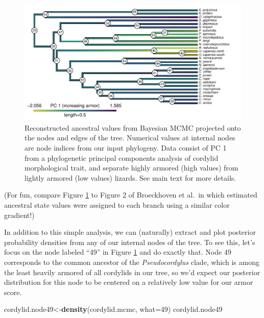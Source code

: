 \documentclass[fleqn,10pt,lineno]{wlpeerj} %
\newenvironment{Shaded}{\begin{snugshade}}{\end{snugshade}}
\newcommand{\AttributeTok}[1]{\textcolor[rgb]{0.13,0.29,0.53}{#1}}
\newcommand{\DecValTok}[1]{\textcolor[rgb]{0.00,0.00,0.81}{#1}}
\newcommand{\FunctionTok}[1]{\textcolor[rgb]{0.13,0.29,0.53}{\textbf{#1}}}
\newcommand{\NormalTok}[1]{#1}
\newcommand{\OtherTok}[1]{\textcolor[rgb]{0.56,0.35,0.01}{#1}}
\begin{document}
\begin{figure}
\includegraphics[width=1\linewidth]{Revell.phytools-v2_peerj_files/figure-latex/cordylid-ace-1} \caption{Reconstructed ancestral values from Bayesian MCMC projected onto the nodes and edges of the tree. Numerical values at internal nodes are node indices from our input phylogeny. Data consist of PC 1 from a phylogenetic principal components analysis of cordylid morphological trait, and separate highly armored (high values) from lightly armored (low values) lizards. See main text for more details.}\label{fig:cordylid-ace}
\end{figure}

(For fun, compare Figure \ref{fig:cordylid-ace} to Figure 2 of Broeckhoven et al.~in which estimated ancestral state values were assigned to each branch using a similar color gradient!)

In addition to this simple analysis, we can (naturally) extract and plot posterior probability densities from any of our internal nodes of the tree. To see this, let's focus on the node labeled ``49'' in Figure \ref{fig:cordylid-ace} and do exactly that. Node 49 corresponds to the common ancestor of the \emph{Pseudocordylus} clade, which is among the least heavily armored of all cordylids in our tree, so we'd expect our posterior distribution for this node to be centered on a relatively low value for our armor score.

\begin{Shaded}
\begin{Highlighting}[]
\NormalTok{cordylid.node49}\OtherTok{\textless{}{-}}\FunctionTok{density}\NormalTok{(cordylid.mcmc,}
  \AttributeTok{what=}\DecValTok{49}\NormalTok{)}
\NormalTok{cordylid.node49}
\end{Highlighting}
\end{Shaded}
\end{document}
